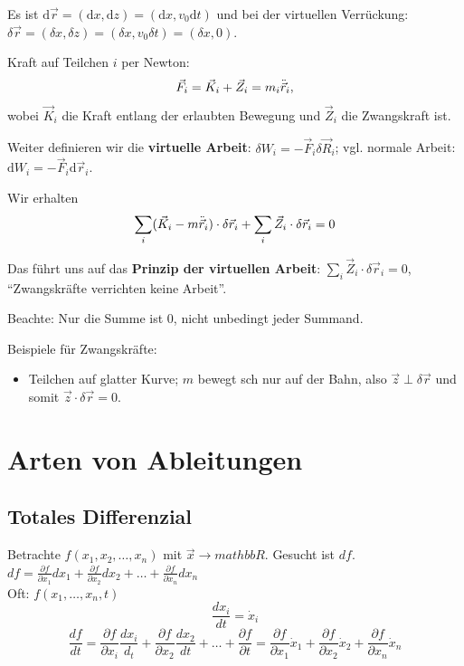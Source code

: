 Es ist $\mathrm{d} \vec{r} = (\mathrm{d} x, \mathrm{d} z) = (\mathrm{d} x, v_0 \mathrm{d} t)$ und bei der virtuellen Verrückung: $\delta \vec{r} = (\delta x, \delta z) = (\delta x, v_0 \delta t) = (\delta x, 0)$.

Kraft auf Teilchen $i$ per Newton: 
\[
	\vec{F}_i = \vec{K}_i + \vec{Z}_i = m_i \ddot{\vec{r}}_i,
\]
wobei $\vec{K}_i$ die Kraft entlang der erlaubten Bewegung und $\vec{Z}_i$ die Zwangskraft ist.

Weiter definieren wir die \textbf{virtuelle Arbeit}: $\delta W_i = - \vec{F}_i \delta \vec{R}_i$; vgl. normale Arbeit: $\mathrm{d} W_i = -\vec{F}_i \mathrm{d} \vec{r}_i$.

Wir erhalten
\[
	\sum_i (\vec{K}_i - m \ddot{\vec{r}}_i) \cdot \delta \vec{r}_i + \sum_i \vec{Z}_i \cdot \delta \vec{r}_i = 0
\]

Das führt uns auf das \textbf{Prinzip der virtuellen Arbeit}: $\sum_i \vec{Z}_i \cdot \delta \vec{r}_i = 0$, "`Zwangskräfte verrichten keine Arbeit"'.

Beachte: Nur die Summe ist $0$, nicht unbedingt jeder Summand.

Beispiele für Zwangskräfte: 
\begin{itemize}
	\item Teilchen auf glatter Kurve; $m$ bewegt sch nur auf der Bahn, also $\vec{z} \perp \delta \vec{r}$ und somit $\vec{z} \cdot \delta \vec{r} = 0$.
\end{itemize}

\section{Arten von Ableitungen}
\subsection{Totales Differenzial}
Betrachte $f(x_1, x_2, \ldots, x_n)$ mit $\vec x \rightarrow mathbb{R}$. Gesucht ist $df$.\\

$df = \frac{\partial f}{\partial x_1} dx_1 + \frac{\partial f}{\partial x_2} dx_2 + \ldots + \frac{\partial f}{\partial x_n} dx_n$\\

Oft: $f(x_1, \ldots, x_n, t)$
\[ \frac{dx_i}{dt} = \dot x_i \]
\[ \frac{df}{dt} = \frac{\partial f}{\partial x_i} \frac{d x_i}{d_t} + \frac{\partial f}{\partial x_2} \frac{d x_2}{d t} + \ldots + \frac{\partial f}{\partial t} = \frac{\partial f}{\partial x_1} \dot x_1 + \frac{\partial f}{\partial x_2} \dot x_2 + \frac{\partial f}{\partial x_n} \dot x_n \]